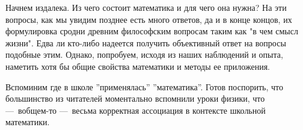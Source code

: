 \documentclass[math.tex]{subfiles}
\begin{document}
	Начнем издалека.
Из чего состоит математика и для чего она нужна?
На эти вопросы, как мы увидим позднее есть много ответов, да и в конце концов, их формулировка сродни древним философским вопросам таким как "в чем смысл жизни".
Едва ли кто-либо надеется получить объективный ответ на вопросы \linebreak подобные этим.
Однако, попробуем, исходя из наших наблюдений и опыта, \linebreak наметить хотя бы общие свойства математики и методы ее приложения.

	Вспоминим где в школе ''применялась'' ''математика''. 
Готов поспорить, что большинство из читателей моментально вспомнили уроки физики, что —\ вобщем-то —\ весьма корректная ассоциация в контексте школьной математики.
\end{document}
